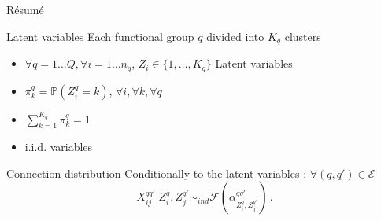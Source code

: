 \documentclass[compress,10pt]{beamer}
\begin{document}
 
 \begin{frame}{Résumé}
     \begin{block}{Latent variables}
             Each functional group  $q$  divided into $K_q$ clusters
              \begin{itemize}
     
                \item $\forall q=1\dots Q, \forall i=1\dots n_q$, $Z_i \in \{1,\dots, K_q\}$ Latent variables
              \item $\pi^q_k = \mathbb{P}(Z^q_i = k)$, $\forall i, \forall k,\forall q$
              \item $\sum_{k=1}^{K_q} \pi^q_k=1$
              \item i.i.d. variables
   
              \end{itemize}
            \end{block}
            
             
  \begin{block}{Connection distribution}
  Conditionally to the latent variables : $\forall (q,q') \in \mathcal{E}$
$$
X^{qq'}_{ij} | Z^{q}_i, Z^{q'}_j \sim_{ind} \mathcal{F}(\alpha^{qq'}_{Z^q_i, Z^{q'}_j})\,.
$$
\end{block}
\end{frame}
\end{document}
